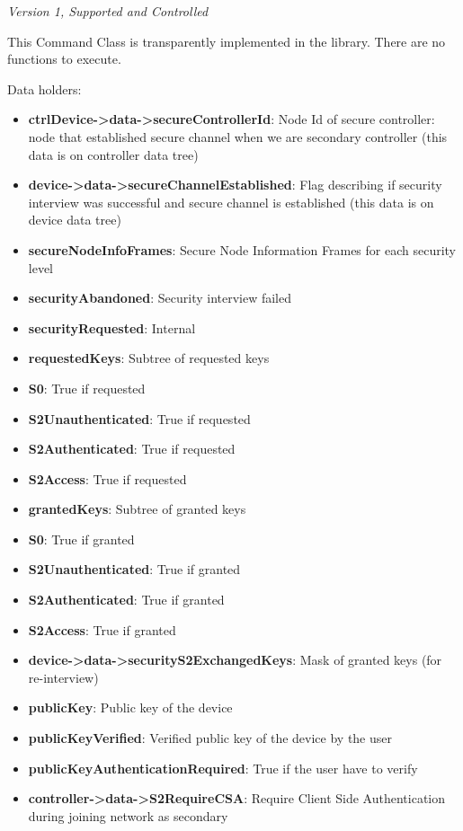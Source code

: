 \textit{Version 1, Supported and Controlled}
\newline

This Command Class is transparently implemented in the library. There are no functions to execute.
\newline

\noindent
Data holders:

\begin{itemize}
\item \textbf{ctrlDevice->data->secureControllerId}: Node Id of secure controller: node that established secure channel when we are secondary controller (this data is on controller data tree)
\item \textbf{device->data->secureChannelEstablished}: Flag describing if security interview was successful and secure channel is established (this data is on device data tree)
\item \textbf{secureNodeInfoFrames}: Secure Node Information Frames for each security level
\item \textbf{securityAbandoned}: Security interview failed
\item \textbf{securityRequested}: Internal
\item \textbf{requestedKeys}: Subtree of requested keys
\item \qquad\textbf{S0}: True if requested
\item \qquad\textbf{S2Unauthenticated}: True if requested
\item \qquad\textbf{S2Authenticated}: True if requested
\item \qquad\textbf{S2Access}: True if requested
\item \textbf{grantedKeys}: Subtree of granted keys
\item \qquad\textbf{S0}: True if granted
\item \qquad\textbf{S2Unauthenticated}: True if granted
\item \qquad\textbf{S2Authenticated}: True if granted
\item \qquad\textbf{S2Access}: True if granted
\item \textbf{device->data->securityS2ExchangedKeys}: Mask of granted keys (for re-interview)
\item \textbf{publicKey}: Public key of the device
\item \textbf{publicKeyVerified}: Verified public key of the device by the user
\item \textbf{publicKeyAuthenticationRequired}: True if the user have to verify
\item \textbf{controller->data->S2RequireCSA}: Require Client Side Authentication during joining network as secondary
\end{itemize}

